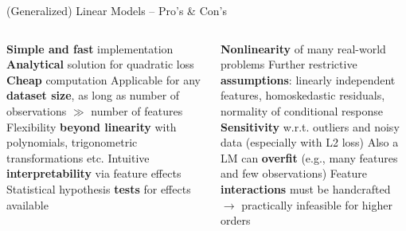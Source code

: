 \begin{frame}{(Generalized) Linear Models -- Pro's \& Con's}



\begin{columns}[onlytextwidth]
  \begin{column}{0.5\textwidth}
    
    \begin{procon}
      \setlength{\itemsep}{1pt}
      \setlength{\parskip}{1pt}
      \positem \textbf{Simple and fast} implementation
      \positem \textbf{Analytical} solution for quadratic loss
      \positem \textbf{Cheap} computation
      \positem Applicable for any \textbf{dataset size}, as long as number of 
      observations $\gg$ number of features
      \positem Flexibility \textbf{beyond linearity} with polynomials, 
      trigonometric transformations etc.
      \positem Intuitive \textbf{interpretability} via feature effects
      \positem Statistical hypothesis \textbf{tests} for effects available
    \end{procon}
  \end{column}

  \begin{column}{0.5\textwidth}
    
    \begin{itemize}
      \negitem \textbf{Nonlinearity} of many real-world problems
      \negitem Further restrictive \textbf{assumptions}: linearly independent 
      features, homoskedastic residuals, normality of conditional response 
      \negitem \textbf{Sensitivity} w.r.t. outliers and noisy data (especially 
      with L2 loss)
      \negitem Also a LM can \textbf{overfit} (e.g., many features and few observations) 
      \negitem Feature \textbf{interactions} must be handcrafted\\
      $\rightarrow$ practically infeasible for higher orders
    \end{itemize}
  \end{column}
\end{columns}

\vfill

\small


\end{frame}